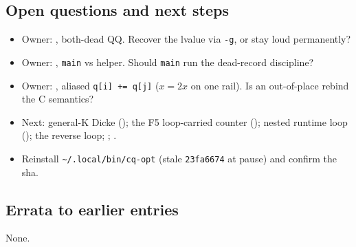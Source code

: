 \subsection*{Open questions and next steps}
\begin{itemize}[itemsep=1pt]
\item Owner: , both-dead QQ. Recover the lvalue via \texttt{-g}, or stay loud permanently?
\item Owner: , \texttt{main} vs helper. Should \texttt{main} run the dead-record discipline?
\item Owner: , aliased \texttt{q[i] += q[j]} ($x = 2x$ on one rail). Is an out-of-place rebind the C semantics?
\item Next: general-K Dicke (); the F5 loop-carried counter ();  nested runtime loop (); the  reverse loop; ; .
\item Reinstall \texttt{\textasciitilde/.local/bin/cq-opt} (stale \texttt{23fa6674} at pause) and confirm the sha.
\end{itemize}

\subsection*{Errata to earlier entries}
None.
\endgroup
